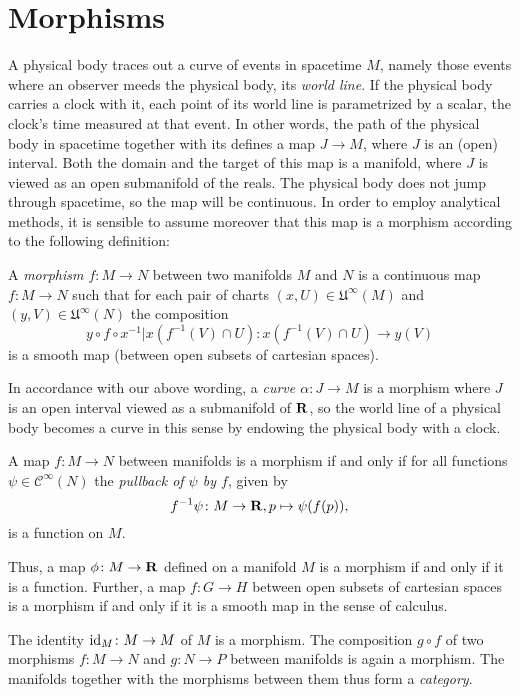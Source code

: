 \section{Morphisms}
\label{sec:morphisms}

A physical body traces out a curve of events in spacetime $M$, namely those events
where an observer meeds the physical body, its \emph{world line}. If the physical
body carries a clock with it, each point of its world line is parametrized by
a scalar, the clock's time measured at that event. In other words, the path of
the physical body in spacetime together with its defines a map $J \to M$, 
where $J$ is an (open) interval. Both the domain and the target of this map is a 
manifold, where $J$ is viewed as an open submanifold of the reals. The physical
body does not jump through spacetime, so the map will be continuous.
In order to employ analytical methods, it is sensible to assume moreover that
this map is a morphism according to the following definition:

\begin{dfn}
  A \emph{morphism $f\colon M \to N$} between two manifolds $M$ and $N$ is a
  continuous map $f\colon M \to N$ such that for each pair of charts
  $(x, U) \in \mathfrak U^\infty(M)$ and $(y, V) \in \mathfrak U^\infty(N)$ the
  composition
  \[
    y \circ f \circ x^{-1}|x(f^{-1}(V) \cap U)\colon x(f^{-1}(V) \cap U) \to y(V) 
  \]
  is a smooth map (between open subsets of cartesian spaces).
\end{dfn}

In accordance with our above wording, a \emph{curve $\alpha\colon J \to M$} is a
morphism where $J$ is an open interval viewed as a submanifold of $\mathbf{R}$, so
the world line of a physical body becomes a curve in this sense
by endowing the physical body with a clock.

A map $f\colon M \to N$ between manifolds is a morphism if and only if
for all functions $\psi \in \mathcal C^\infty(N)$ the \emph{pullback of $\psi$
by $f$}, given by
\begin{equation}
  f^{-1}\psi\colon M \to \mathbf{R}, p \mapsto \psi(f(p)),
\end{equation}
is a function on $M$.

Thus, a map $\phi\colon M \to \mathbf{R}$ defined on a manifold $M$ is a
morphism if and only if it is a function. Further, a map $f\colon G \to H$ between
open subsets of cartesian spaces is a morphism if and only if it is a smooth
map in the sense of calculus.

The identity $\mathrm{id}_M\colon M \to M$ of $M$ is a morphism. The composition $g \circ f$
of two morphisms $f\colon M \to N$ and $g\colon N \to P$ between manifolds is
again a morphism. The manifolds together with the morphisms between them thus
form a \emph{category}.

